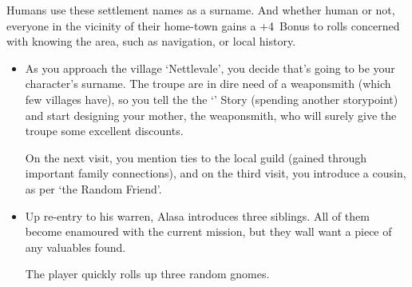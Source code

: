 \begin{multicols}{2}
Humans use these settlement names as a surname.
And whether human or not, everyone in the vicinity of their home-town gains a +4~Bonus to rolls concerned with knowing the area, such as \gls{navigation}, or local history.

\begin{itemize}
  \item
  As you approach the \gls{village} `Nettlevale', you decide that's going to be your character's surname.
  The troupe are in dire need of a weaponsmith (which few \glspl{village} have), so you tell the the `' Story (spending another \gls{storypoint}) and start designing your mother, the weaponsmith, who will surely give the troupe some excellent discounts.

  On the next visit, you mention ties to the local guild (gained through important family connections), and on the third visit, you introduce a cousin, as per `the Random Friend'.
  \item
  Up re-entry to his warren, Alasa introduces three siblings.
  All of them become enamoured with the current mission, but they wall want a piece of any valuables found.

  The player quickly rolls up three random gnomes.
\end{itemize}

\end{multicols}
